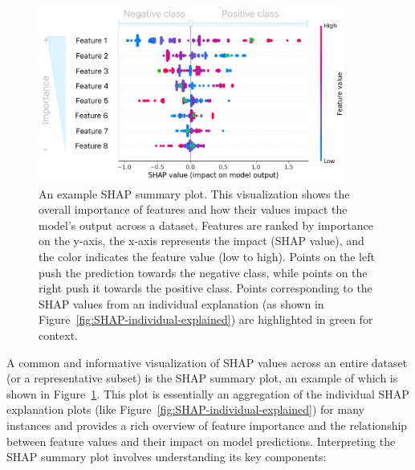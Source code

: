 \documentclass[12pt,a4paper]{report}
\begin{document}
\begin{figure}[h!]
  \centering
  \includegraphics[width=0.9\textwidth]{images/SHAP-explained.png}
  \caption[Example SHAP Summary Plot]{An example SHAP summary plot. This visualization shows the overall importance of features and how their values impact the model's output across a dataset. Features are ranked by importance on the y-axis, the x-axis represents the impact (SHAP value), and the color indicates the feature value (low to high). Points on the left push the prediction towards the negative class, while points on the right push it towards the positive class. Points corresponding to the SHAP values from an individual explanation (as shown in Figure~\ref{fig:SHAP-individual-explained}) are highlighted in green for context.}
  \label{fig:SHAP-plot-explained}
\end{figure}
\noindent
A common and informative visualization of SHAP values across an entire dataset (or a representative subset) is the SHAP summary plot, an example of which is shown in Figure~\ref{fig:SHAP-plot-explained}. This  plot is essentially an aggregation of the individual SHAP explanation plots (like Figure~\ref{fig:SHAP-individual-explained}) for many instances and provides a rich overview of feature importance and the relationship between feature values and their impact on model predictions. Interpreting the SHAP summary plot involves understanding its key components:
\pagebreak
\end{document}
